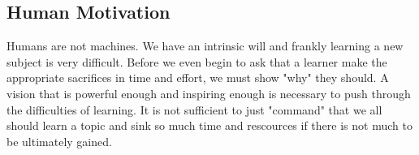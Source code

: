 \documentclass[a4paper, 12pt]{report}
\begin{document}
\begin{center}
\begin{comment}
I would argue that academic knowledge is a much more important game that typical games out there because it has the side effect of producing technological advancements.
Technological advancements will certainly benefit our current lives and so this useful side effect of academic knowledge would make academic knowledge a superior form of game compared to others.

The downside of academic knowledge is that it has a high overhead. Studying for the initial rules before getting to the manipulation part is an incredibly time-consuming and difficult process.
Therefore, this is a high effort, high stakes, high reward type of game.
Unlike the normal video games that require very little investment to be able to play.
\end{comment}

\subsection{Human Motivation}
\begin{comment}
\end{comment}
Humans are not machines. We have an intrinsic will and frankly learning a new subject is very difficult.
Before we even begin to ask that a learner make the appropriate sacrifices in time and effort, we must show "why" they should. 
A vision that is powerful enough and inspiring enough is necessary to push through the difficulties of learning. 
It is not sufficient to just "command" that we all should learn a topic and sink so much time and rescources if there is not much to be ultimately gained.


\end{center}
\end{document}
